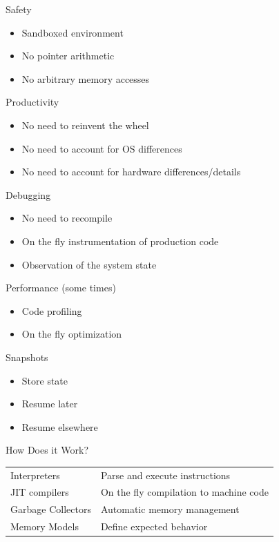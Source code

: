 \documentclass[
14pt,
aspectratio=169,
usenames,
dvipsnames,
x11names]{beamer}
\begin{document}
\begin{frame}{Safety}
  \begin{itemize}  \setlength{\itemsep}{\fill}
  \item Sandboxed environment
  \item No pointer arithmetic
  \item No arbitrary memory accesses
  \end{itemize}
\end{frame}

\begin{frame}{Productivity}
  \begin{itemize}  \setlength{\itemsep}{\fill}
  \item No need to reinvent the wheel
  \item No need to account for OS differences
  \item No need to account for hardware differences/details
  \end{itemize}
\end{frame}

\begin{frame}{Debugging}
  \begin{itemize}  \setlength{\itemsep}{\fill}
  \item No need to recompile
  \item On the fly instrumentation of production code
  \item Observation of the system state
  \end{itemize}
\end{frame}

\begin{frame}{Performance (some times)}
  \begin{itemize}  \setlength{\itemsep}{\fill}
  \item Code profiling
  \item On the fly optimization
  \end{itemize}
\end{frame}

\begin{frame}{Snapshots}
  \begin{itemize}  \setlength{\itemsep}{\fill}
  \item Store state
  \item Resume later
  \item Resume elsewhere
  \end{itemize}
\end{frame}

\begin{frame}{How Does it Work?}
  \def\arraystretch{2}
  \centering
  \begin{tabular}{l l}
   \alert{Interpreters}       & Parse and execute instructions \\
   \alert{JIT compilers}      & On the fly compilation to machine code \\
   \alert{Garbage Collectors} & Automatic memory management \\
   \alert{Memory Models}      & Define expected behavior
  \end{tabular}
\end{frame}
\end{document}

